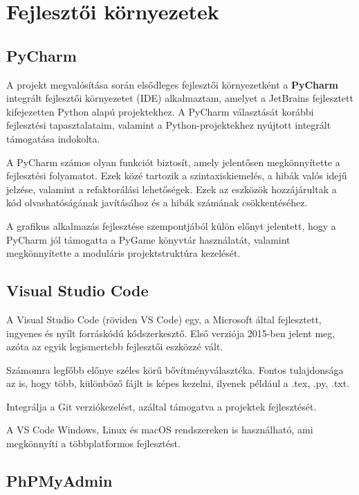 \documentclass[]{thesis-ekf}
\begin{document}
	\section{Fejlesztői környezetek}
	\subsection{PyCharm}
	
	A projekt megvalósítása során elsődleges fejlesztői környezetként a \textbf{PyCharm}\cite{PyCharm} integrált fejlesztői környezetet (IDE) alkalmaztam, amelyet a JetBrains fejlesztett kifejezetten Python alapú projektekhez. A PyCharm választását korábbi fejlesztési tapasztalataim, valamint a Python-projektekhez nyújtott integrált támogatása indokolta.
	
	A PyCharm számos olyan funkciót biztosít, amely jelentősen megkönnyítette a fejlesztési folyamatot. Ezek közé tartozik a szintaxiskiemelés, a hibák valós idejű jelzése, valamint a refaktorálási lehetőségek. Ezek az eszközök hozzájárultak a kód olvashatóságának javításához és a hibák számának csökkentéséhez.
	
	A grafikus alkalmazás fejlesztése szempontjából külön előnyt jelentett, hogy a PyCharm jól támogatta a PyGame\cite{PyGame} könyvtár használatát, valamint megkönnyítette a moduláris projektstruktúra kezelését.
	
	\subsection{Visual Studio Code}
	
	A Visual Studio Code (röviden VS Code)\cite{VisualStudioCode} egy, a Microsoft által fejlesztett, ingyenes és nyílt forráskódú kódszerkesztő. Első verziója 2015-ben jelent meg, azóta az egyik legismertebb fejlesztői eszközzé vált.
	
	Számomra legfőbb előnye széles körű bővítményválasztéka. Fontos tulajdonsága az is, hogy több, különböző fájlt is képes kezelni, ilyenek például a .tex, .py, .txt.
	
	Integrálja a Git verziókezelést, azáltal támogatva a projektek fejlesztését.
	
	A VS Code Windows, Linux és macOS rendszereken is használható, ami megkönnyíti a többplatformos fejlesztést.
	
	\subsection{PhPMyAdmin}
	
\end{document}
